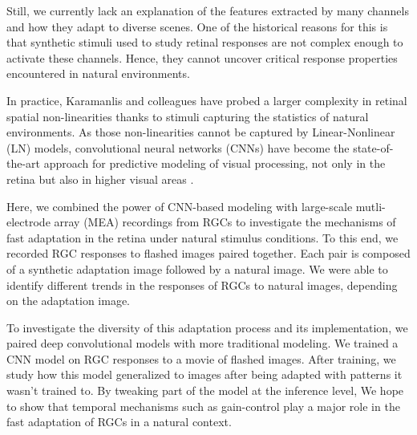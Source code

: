 Still, we currently lack an explanation of the features extracted by many
channels and how they adapt to diverse scenes. One of the historical
reasons for this is that synthetic stimuli used
to study retinal responses are not complex enough to activate these channels.
Hence, they cannot uncover critical response properties encountered in natural
environments. %

In practice, Karamanlis and colleagues \citep{kim_nonlinear_2020} have
probed a larger complexity in retinal spatial non-linearities thanks to stimuli
capturing the statistics of natural environments.
As those non-linearities cannot be captured by Linear-Nonlinear (LN) models,
convolutional neural networks (CNNs) have become the state-of-the-art approach
for predictive modeling of visual processing, not only in the retina but also
in higher visual areas \citep{mcintosh_deep_2017}.

Here, we combined the power of CNN-based modeling with large-scale
mutli-electrode array (MEA) recordings from RGCs to investigate the mechanisms
of fast
adaptation in the retina under natural stimulus conditions. To this end, we
recorded RGC responses to flashed images paired together. Each pair is composed
of a synthetic adaptation image followed by a natural image. We were able to
identify different trends in the responses of RGCs to natural images, depending
on the adaptation image. %

To investigate the diversity of this adaptation process and its implementation,
we paired deep convolutional models with more traditional modeling. We trained
a CNN model on RGC responses to a movie of flashed images. After training, we
study how this model generalized to images after being adapted with
patterns it wasn't trained to. By tweaking part of the model at the inference
level, We hope to show that temporal mechanisms such as gain-control play a
major role in the fast adaptation of RGCs in a natural context.
